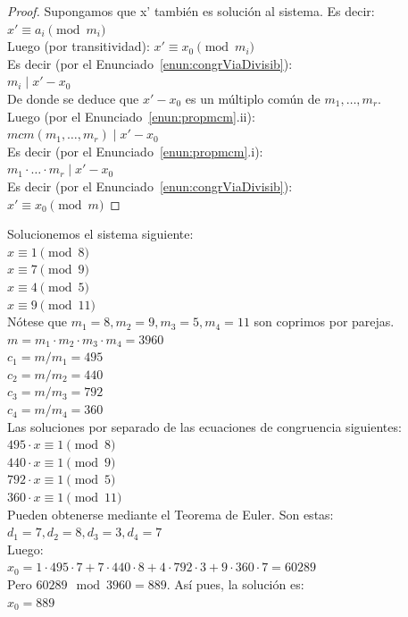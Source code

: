 \begin{proof}
Supongamos que x' también es solución al sistema. Es decir:\\
$x' \equiv a_{i}\pmod {m_{i}}$\\
Luego (por transitividad): $x' \equiv x_{0}\pmod {m_{i}}$\\
Es decir (por el Enunciado~\ref{enun:congrViaDivisib}):\\
$m_{i} \mid x'-x_{0}$\\
De donde se deduce que $x'-x_{0}$ es un múltiplo común de $m_{1}, \ldots, m_{r}$.\\
Luego (por el Enunciado~\ref{enun:propmcm}.ii):\\
$mcm(m_{1}, \ldots, m_{r}) \mid x'-x_{0}$\\
Es decir (por el Enunciado~\ref{enun:propmcm}.i):\\
$m_{1} \cdot \ldots \cdot m_{r} \mid x'-x_{0}$\\
Es decir (por el Enunciado~\ref{enun:congrViaDivisib}):\\
$x' \equiv x_{0}\pmod m$
\end{proof}

\begin{ejemplo}
Solucionemos el sistema siguiente:\\
$x \equiv 1\pmod 8$\\
$x \equiv 7\pmod 9$\\
$x \equiv 4\pmod 5$\\
$x \equiv 9\pmod {11}$\\
Nótese que $m_{1}=8, m_{2}=9, m_{3}=5, m_{4}=11$ son coprimos por parejas.\\
$m=m_{1} \cdot m_{2} \cdot m_{3} \cdot m_{4}=3960$\\
$c_{1}=m / m_{1}=495$\\
$c_{2}=m / m_{2}=440$\\
$c_{3}=m / m_{3}=792$\\
$c_{4}=m / m_{4}=360$ \\
Las soluciones por separado de las ecuaciones de congruencia siguientes:\\
$495 \cdot x \equiv 1 \pmod 8$\\
$440 \cdot x \equiv 1 \pmod 9$\\
$792 \cdot x \equiv 1 \pmod 5$\\
$360 \cdot x \equiv 1 \pmod {11}$\\
Pueden obtenerse mediante el Teorema de Euler. Son estas:\\
$d_{1}=7, d_{2}=8, d_{3}=3, d_{4}=7$\\
Luego:\\
$x_{0}=1 \cdot 495 \cdot 7+7 \cdot 440 \cdot 8+4 \cdot 792 \cdot 3+9 \cdot 360 \cdot 7=60289$\\
Pero $60289 \mod 3960=889$. Así pues, la solución es:\\
$x_{0}=889$
\end{ejemplo}

